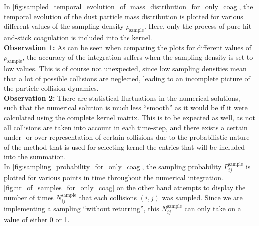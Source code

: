        In \cref{fig:sampled_temporal_evolution_of_mass_distribution_for_only_coag}, the 
        temporal evolution of the dust particle mass distribution is plotted for 
        various different values of the sampling density $\rho_\text{sample}$. Here, 
        only the process of pure hit-and-stick coagulation is included into the kernel. \\

        \textbf{Observation 1:} As can be seen when comparing the plots for different 
        values of $\rho_\text{sample}$, the accuracy of the integration suffers when 
        the sampling density is set to low values. This is of course not unexpected,
        since low sampling densities mean that a lot of possible collisions are neglected,
        leading to an incomplete picture of the particle collision dynamics. \\

        \textbf{Observation 2:} There are statistical fluctuations in the numerical solutions,
        such that the numerical solution is much less ``smooth'' as it would be if it were 
        calculated using the complete kernel matrix.
        This is to be expected as well, as not all collisions are taken into account 
        in each time-step, and there exists a certain under- or over-representation 
        of certain collisions due to the probabilistic nature of the method that is 
        used for selecting kernel the entries that will be included into the summation. \\


        In \cref{fig:sampling_probability_for_only_coag}, the sampling probability 
        $P_{ij}^\text{sample}$ is plotted for various points in time throughout the 
        numerical integration. \cref{fig:nr_of_samples_for_only_coag} on the other 
        hand attempts to display the number of times $N^\text{sample}_{ij}$ that each 
        collisions $(i, j)$ was sampled. Since we are implementing a sampling 
        ``without returning'', this $N^\text{sample}_{ij}$ can only take on a value of 
        either 0 or 1. \\


